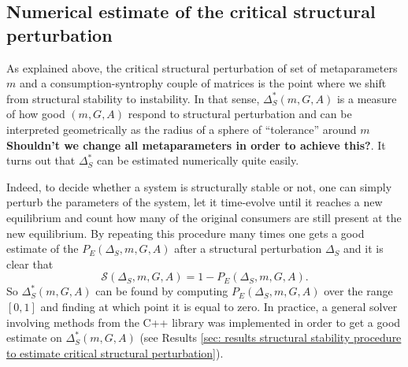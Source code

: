 \documentclass[12pt, titlepage]{report}
\begin{document}
\subsection{Numerical estimate of the critical structural perturbation}\label{sec : structural stability methods numerical estimate critical perturbation}
As explained above, the critical structural perturbation of set of metaparameters $m$ and a consumption-syntrophy couple of matrices is the point where we shift from structural stability to instability. In that sense, $\Delta_S^*(m, G, A)$ is a measure of how good $(m, G, A)$ respond to structural perturbation and can be interpreted geometrically as the radius of a sphere of ``tolerance'' around $m$ \textbf{Shouldn't we change all metaparameters in order to achieve this?}. It turns out that $\Delta_S^*$ can be estimated numerically quite easily.

Indeed, to decide whether a system is structurally stable or not, one can simply perturb the parameters of the system, let it time-evolve until it reaches a new equilibrium and count how many of the original consumers are still present at the new equilibrium. By repeating this procedure many times one gets a good estimate of the  $P_E(\Delta_S, m, G, A)$
after a structural perturbation $\Delta_S$ and it is clear that
\begin{equation}
\mathcal{S}(\Delta_S, m, G, A)=1-P_E(\Delta_S, m, G, A).
\end{equation}
So $\Delta_S^*(m, G, A)$ can be found by computing $P_E(\Delta_S, m, G, A)$ over the range $[0,1]$ and finding at which point it is equal to zero. In practice, a general solver involving methods from the C++  library was implemented in order to get a good estimate on $\Delta_S^*(m, G, A)$ (see Results \ref{sec: results structural stability procedure to estimate critical structural perturbation}).

\end{document}
